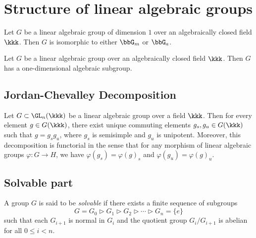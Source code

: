 \section{Structure of linear algebraic groups}


    \begin{theorem}\label{thm:classification_of_linear_alg_gp_of_dim1}
        Let \(G\) be a linear algebraic group of dimension \(1\) over an algebraically closed field \(\kkk\). 
        Then \(G\) is isomorphic to either \(\bbG_m\) or \(\bbG_a\).
    \end{theorem}

    \begin{lemma}\label{lem:any_linear_alg_gp_has_one_dimensional_alg_subgroup}
        Let \(G\) be a linear algebraic group over an algebraically closed field \(\kkk\). 
        Then \(G\) has a one-dimensional algebraic subgroup.
    \end{lemma}


\subsection{Jordan-Chevalley Decomposition}

    \begin{theorem}\label{thm:jordan_chevalley_decomposition}
        Let \(G \subset \GL_n(\kkk)\) be a linear algebraic group over a field \(\kkk\). 
        Then for every element \(g \in G(\kkk)\), there exist unique commuting elements \(g_s, g_u \in G(\kkk)\) such that \(g = g_s g_u\), where \(g_s\) is semisimple and \(g_u\) is unipotent.
        Moreover, this decomposition is functorial in the sense that for any morphism of linear algebraic groups \(\varphi: G \to H\), we have \(\varphi(g_s) = \varphi(g)_s\) and \(\varphi(g_u) = \varphi(g)_u\).
    \end{theorem}

\subsection{Solvable part}

    \begin{definition}\label{def:solvable_group}
        A group \(G\) is said to be \emph{solvable} if there exists a finite sequence of subgroups
        \[
            G = G_0 \triangleright G_1 \triangleright G_2 \triangleright \cdots \triangleright G_n = \{e\}
        \]
        such that each \(G_{i+1}\) is normal in \(G_i\) and the quotient group \(G_i/G_{i+1}\) is abelian for all \(0 \leq i < n\).
    \end{definition}

